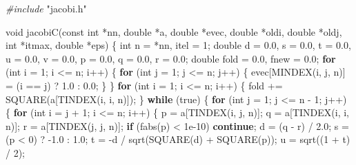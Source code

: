 \documentclass[
  12pt,
]{book}
\newenvironment{Shaded}{\begin{snugshade}}{\end{snugshade}}
\newcommand{\ControlFlowTok}[1]{\textcolor[rgb]{0.13,0.29,0.53}{\textbf{#1}}}
\newcommand{\DataTypeTok}[1]{\textcolor[rgb]{0.13,0.29,0.53}{#1}}
\newcommand{\DecValTok}[1]{\textcolor[rgb]{0.00,0.00,0.81}{#1}}
\newcommand{\FloatTok}[1]{\textcolor[rgb]{0.00,0.00,0.81}{#1}}
\newcommand{\ImportTok}[1]{#1}
\newcommand{\NormalTok}[1]{#1}
\newcommand{\PreprocessorTok}[1]{\textcolor[rgb]{0.56,0.35,0.01}{\textit{#1}}}
\theoremstyle{definition}
\theoremstyle{definition}
\theoremstyle{definition}
\theoremstyle{definition}
\theoremstyle{remark}
\begin{document}
\begin{Shaded}
\begin{Highlighting}[]
\PreprocessorTok{\#include }\ImportTok{"jacobi.h"}

\DataTypeTok{void}\NormalTok{ jacobiC(}\DataTypeTok{const} \DataTypeTok{int}\NormalTok{ *nn, }\DataTypeTok{double}\NormalTok{ *a, }\DataTypeTok{double}\NormalTok{ *evec, }\DataTypeTok{double}\NormalTok{ *oldi, }\DataTypeTok{double}\NormalTok{ *oldj,}
             \DataTypeTok{int}\NormalTok{ *itmax, }\DataTypeTok{double}\NormalTok{ *eps) \{}
    \DataTypeTok{int}\NormalTok{ n = *nn, itel = }\DecValTok{1}\NormalTok{;}
    \DataTypeTok{double}\NormalTok{ d = }\FloatTok{0.0}\NormalTok{, s = }\FloatTok{0.0}\NormalTok{, t = }\FloatTok{0.0}\NormalTok{, u = }\FloatTok{0.0}\NormalTok{, v = }\FloatTok{0.0}\NormalTok{, p = }\FloatTok{0.0}\NormalTok{, q = }\FloatTok{0.0}\NormalTok{,}
\NormalTok{           r = }\FloatTok{0.0}\NormalTok{;}
    \DataTypeTok{double}\NormalTok{ fold = }\FloatTok{0.0}\NormalTok{, fnew = }\FloatTok{0.0}\NormalTok{;}
    \ControlFlowTok{for}\NormalTok{ (}\DataTypeTok{int}\NormalTok{ i = }\DecValTok{1}\NormalTok{; i \textless{}= n; i++) \{}
        \ControlFlowTok{for}\NormalTok{ (}\DataTypeTok{int}\NormalTok{ j = }\DecValTok{1}\NormalTok{; j \textless{}= n; j++) \{}
\NormalTok{            evec[MINDEX(i, j, n)] = (i == j) ? }\FloatTok{1.0}\NormalTok{ : }\FloatTok{0.0}\NormalTok{;}
\NormalTok{        \}}
\NormalTok{    \}}
    \ControlFlowTok{for}\NormalTok{ (}\DataTypeTok{int}\NormalTok{ i = }\DecValTok{1}\NormalTok{; i \textless{}= n; i++) \{}
\NormalTok{        fold += SQUARE(a[TINDEX(i, i, n)]);}
\NormalTok{    \}}
    \ControlFlowTok{while}\NormalTok{ (true) \{}
        \ControlFlowTok{for}\NormalTok{ (}\DataTypeTok{int}\NormalTok{ j = }\DecValTok{1}\NormalTok{; j \textless{}= n {-} }\DecValTok{1}\NormalTok{; j++) \{}
            \ControlFlowTok{for}\NormalTok{ (}\DataTypeTok{int}\NormalTok{ i = j + }\DecValTok{1}\NormalTok{; i \textless{}= n; i++) \{}
\NormalTok{                p = a[TINDEX(i, j, n)];}
\NormalTok{                q = a[TINDEX(i, i, n)];}
\NormalTok{                r = a[TINDEX(j, j, n)];}
                \ControlFlowTok{if}\NormalTok{ (fabs(p) \textless{} }\FloatTok{1e{-}10}\NormalTok{) }\ControlFlowTok{continue}\NormalTok{;}
\NormalTok{                d = (q {-} r) / }\FloatTok{2.0}\NormalTok{;}
\NormalTok{                s = (p \textless{} }\DecValTok{0}\NormalTok{) ? {-}}\FloatTok{1.0}\NormalTok{ : }\FloatTok{1.0}\NormalTok{;}
\NormalTok{                t = {-}d / sqrt(SQUARE(d) + SQUARE(p));}
\NormalTok{                u = sqrt((}\DecValTok{1}\NormalTok{ + t) / }\DecValTok{2}\NormalTok{);}

\end{Highlighting}
\end{Shaded}
\end{document}
